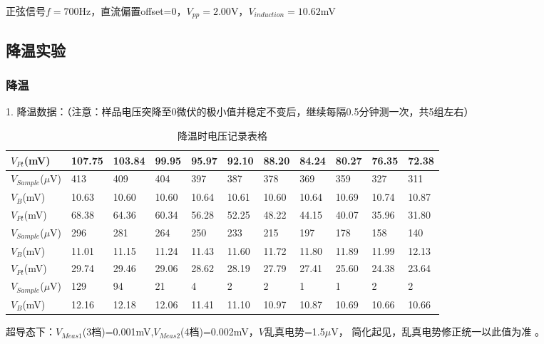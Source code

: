 \documentclass[UTF8]{ctexart}
\begin{document}
    正弦信号$f=700$Hz，直流偏置offset=0，$V_{pp}=2.00$V，$V_{induction}=10.62$mV

    \subsection{降温实验}

    \subsubsection{降温}

    1. 降温数据：（注意：样品电压突降至0微伏的极小值并稳定不变后，继续每隔0.5分钟测一次，共5组左右）

    \begin{table}[H]
        \centering
        \begin{tabular}{|l|l|l|l|l|l|l|l|l|l|l|}
        \hline
            $V_{Pt}$(mV) & 107.75 & 103.84 & 99.95 & 95.97 & 92.10 & 88.20 & 84.24 & 80.27 & 76.35 & 72.38 \\ \hline
            $V_{Sample}$($\mu$V) & 413 & 409 & 404 & 397 & 387 & 378 & 369 & 359 & 327 & 311 \\ \hline
            $V_B$(mV) & 10.63 & 10.60 & 10.60 & 10.64 & 10.61 & 10.60 & 10.64 & 10.69 & 10.74 & 10.87 \\ \hline
            \hline
            $V_{Pt}$(mV) & 68.38 & 64.36 & 60.34 & 56.28 & 52.25 & 48.22 & 44.15 & 40.07 & 35.96 & 31.80 \\ \hline
            $V_{Sample}$($\mu$V) & 296 & 281 & 264 & 250 & 233 & 215 & 197 & 178 & 158 & 140 \\ \hline
            $V_B$(mV) & 11.01 & 11.15 & 11.24 & 11.43 & 11.60 & 11.72 & 11.80 & 11.89 & 11.99 & 12.13 \\ \hline
            \hline
            $V_{Pt}$(mV) & 29.74 & 29.46 & 29.06 & 28.62 & 28.19 & 27.79 & 27.41 & 25.60 & 24.38 & 23.64 \\ \hline
            $V_{Sample}$($\mu$V) & 129 & 94 & 21 & 4 & 2 & 2 & 1 & 1 & 2 & 2 \\ \hline
            $V_B$(mV) & 12.16 & 12.18 & 12.06 & 11.41 & 11.10 & 10.97 & 10.87 & 10.69 & 10.66 & 10.66 \\ \hline
        \end{tabular}
        \caption{降温时电压记录表格} %
        \label{降温原数据表格} %
    \end{table}

    超导态下：$V_{Meas1}$(3档)=0.001mV,$V_{Meas2}$(4档)=0.002mV，$V$乱真电势=1.5$\mu$V，
    简化起见，乱真电势修正统一以此值为准 。
\end{document}
